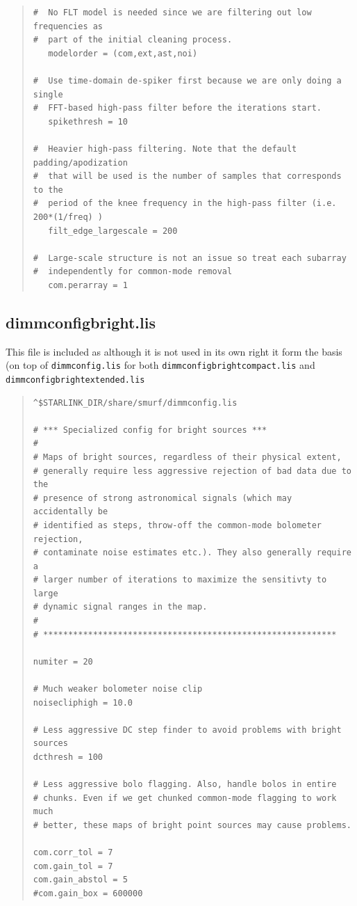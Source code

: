 \documentclass[twoside,11pt]{article}
\renewcommand{\_}{\texttt{\symbol{95}}}
\newenvironment{myquote}{\begin{quote}\begin{small}}{\end{small}\end{quote}}
\begin{document}
\begin{myquote}
\begin{verbatim}
#  No FLT model is needed since we are filtering out low frequencies as
#  part of the initial cleaning process.
   modelorder = (com,ext,ast,noi)

#  Use time-domain de-spiker first because we are only doing a single
#  FFT-based high-pass filter before the iterations start.
   spikethresh = 10

#  Heavier high-pass filtering. Note that the default padding/apodization
#  that will be used is the number of samples that corresponds to the
#  period of the knee frequency in the high-pass filter (i.e. 200*(1/freq) )
   filt_edge_largescale = 200

#  Large-scale structure is not an issue so treat each subarray
#  independently for common-mode removal
   com.perarray = 1
\end{verbatim}
\end{myquote}


\subsection{dimmconfig\_bright.lis}

This file is included as although it is not used in its own right it
form the basis (on top of \texttt{dimmconfig.lis} for both
\texttt{dimmconfig\_bright\_compact.lis} and
\texttt{dimmconfig\_bright\_extended.lis}
\begin{myquote}
\begin{verbatim}
^$STARLINK_DIR/share/smurf/dimmconfig.lis

# *** Specialized config for bright sources ***
#
# Maps of bright sources, regardless of their physical extent,
# generally require less aggressive rejection of bad data due to the
# presence of strong astronomical signals (which may accidentally be
# identified as steps, throw-off the common-mode bolometer rejection,
# contaminate noise estimates etc.). They also generally require a
# larger number of iterations to maximize the sensitivty to large
# dynamic signal ranges in the map.
#
# ***********************************************************

numiter = 20

# Much weaker bolometer noise clip
noisecliphigh = 10.0

# Less aggressive DC step finder to avoid problems with bright sources
dcthresh = 100

# Less aggressive bolo flagging. Also, handle bolos in entire
# chunks. Even if we get chunked common-mode flagging to work much
# better, these maps of bright point sources may cause problems.

com.corr_tol = 7
com.gain_tol = 7
com.gain_abstol = 5
#com.gain_box = 600000
\end{verbatim}
\end{myquote}
\end{document}
